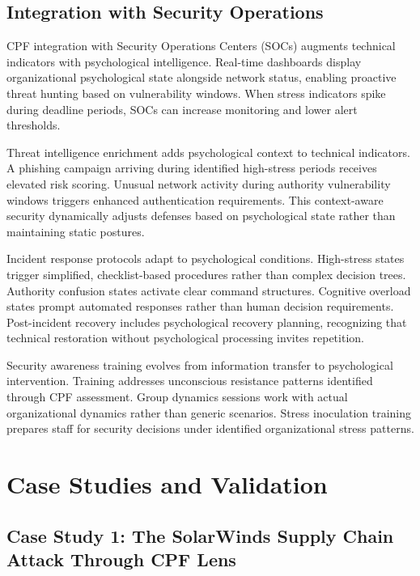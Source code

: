 \documentclass[11pt,a4paper]{article}
\begin{document}
\subsection{Integration with Security Operations}

CPF integration with Security Operations Centers (SOCs) augments technical indicators with psychological intelligence. Real-time dashboards display organizational psychological state alongside network status, enabling proactive threat hunting based on vulnerability windows. When stress indicators spike during deadline periods, SOCs can increase monitoring and lower alert thresholds.

Threat intelligence enrichment adds psychological context to technical indicators. A phishing campaign arriving during identified high-stress periods receives elevated risk scoring. Unusual network activity during authority vulnerability windows triggers enhanced authentication requirements. This context-aware security dynamically adjusts defenses based on psychological state rather than maintaining static postures.

Incident response protocols adapt to psychological conditions. High-stress states trigger simplified, checklist-based procedures rather than complex decision trees. Authority confusion states activate clear command structures. Cognitive overload states prompt automated responses rather than human decision requirements. Post-incident recovery includes psychological recovery planning, recognizing that technical restoration without psychological processing invites repetition.

Security awareness training evolves from information transfer to psychological intervention. Training addresses unconscious resistance patterns identified through CPF assessment. Group dynamics sessions work with actual organizational dynamics rather than generic scenarios. Stress inoculation training prepares staff for security decisions under identified organizational stress patterns.

\section{Case Studies and Validation}

\subsection{Case Study 1: The SolarWinds Supply Chain Attack Through CPF Lens}
\end{document}
